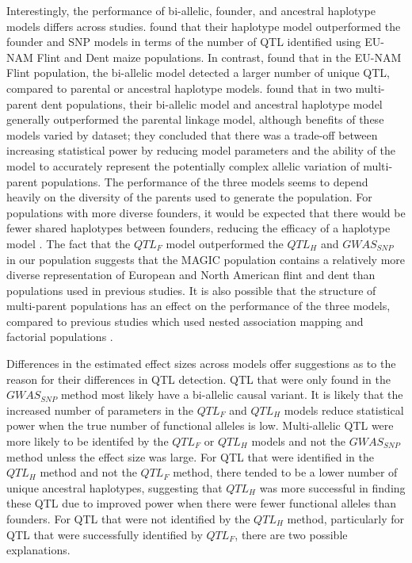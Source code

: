 \documentclass[article,9pt,twocolumn,twoside]{rilabRxiv}
\begin{document}
Interestingly, the performance of bi-allelic, founder, and ancestral haplotype models differs across studies.
\cite{Giraud} found that their haplotype model outperformed the founder and SNP models in terms of the number of QTL identified using EU-NAM Flint and Dent maize populations.
In contrast, \cite{Garin2} found that in the EU-NAM Flint population, the bi-allelic model detected a larger number of unique QTL, compared to parental or ancestral haplotype models.
\cite{Bardol} found that in two multi-parent dent populations, their bi-allelic model and ancestral haplotype model generally outperformed the parental linkage model, although benefits of these models varied by dataset; they concluded that there was a trade-off between increasing statistical power by reducing model parameters and the ability of the model to accurately represent the potentially complex allelic variation of multi-parent populations.
The performance of the three models seems to depend heavily on the diversity of the parents used to generate the population.
For populations with more diverse founders, it would be expected that there would be fewer shared haplotypes between founders, reducing the efficacy of a haplotype model \citep{Giraud}.
The fact that the $QTL_F$ model outperformed the $QTL_H$ and $GWAS_{SNP}$ in our population suggests that the MAGIC population contains a relatively more diverse representation of European and North American flint and dent than populations used in previous studies.
It is also possible that the structure of multi-parent populations has an effect on the performance of the three models, compared to previous studies which used nested association mapping \citep{Giraud,Garin2} and factorial populations \cite{Bardol}.

Differences in the estimated effect sizes across models offer suggestions as to the reason for their differences in QTL detection.
QTL that were only found in the $GWAS_{SNP}$ method most likely have a bi-allelic causal variant.
It is likely that the increased number of parameters in the $QTL_F$ and $QTL_H$ models reduce statistical power when the true number of functional alleles is low.
Multi-allelic QTL were more likely to be identifed by the $QTL_F$ or $QTL_H$ models and not the $GWAS_{SNP}$ method unless the effect size was large.
For QTL that were identified in the $QTL_H$ method and not the $QTL_F$ method, there tended to be a lower number of unique ancestral haplotypes, suggesting that $QTL_H$ was more successful in finding these QTL due to improved power when there were fewer functional alleles than founders.
For QTL that were not identified by  the $QTL_H$ method, particularly for QTL that were successfully identified by $QTL_F$, there are two possible explanations.
\end{document}
